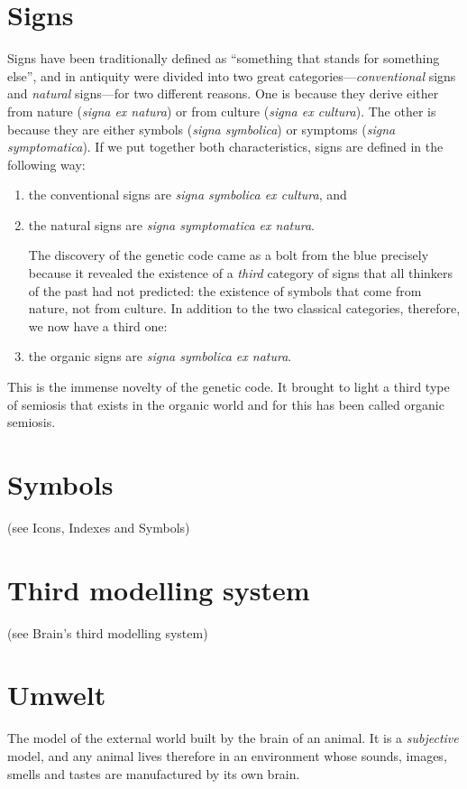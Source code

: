 \documentclass[12pt]{article}
\begin{document}
\section{Signs}
Signs have been traditionally defined as ``something that stands for something else'', and in antiquity were divided into two great categories---\textit{conventional} signs and \textit{natural} signs---for two different reasons. One is because they derive either from nature (\textit{signa ex natura}) or from culture (\textit{signa ex cultura}). The other is because they are either symbols (\textit{signa symbolica}) or symptoms (\textit{signa symptomatica}). If we put together both characteristics, signs are defined in the following way: 
\begin{enumerate}
\item the conventional signs are \textit{signa symbolica ex cultura}, and
\item the natural signs are \textit{signa symptomatica ex natura}.

The discovery of the genetic code came as a bolt from the blue precisely because it revealed the existence of a \textit{third} category of signs that all thinkers of the past had not predicted: the existence of symbols that come from nature, not from culture. In addition to the two classical categories, therefore, we now have a third one:

\item the organic signs are \textit{signa symbolica ex natura}.
\end{enumerate}
This is the immense novelty of the genetic code. It brought to light a third type of semiosis that exists in the organic world and for this has been called organic semiosis.
 

\section{Symbols} (see Icons, Indexes and Symbols)


\section{Third modelling system} (see Brain's third modelling system)


\section{Umwelt}
The model of the external world built by the brain of an animal. It is a \textit{subjective} model, and any animal lives therefore in an environment whose sounds, images, smells and tastes are manufactured by its own brain.
\end{document}
